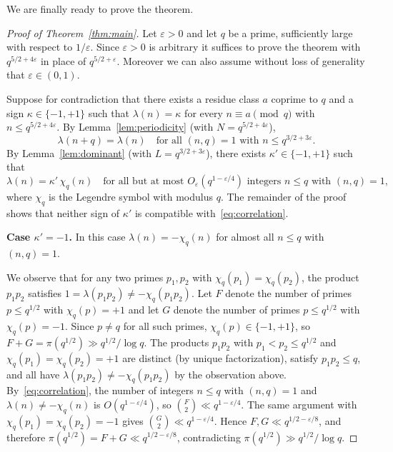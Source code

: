 \documentclass[11pt]{amsart}
\begin{document}
We are finally ready to prove the theorem. 

\begin{proof}[Proof of Theorem~\ref{thm:main}]
Let $\varepsilon > 0$ and let $q$ be a prime, sufficiently large
with respect to $1/\varepsilon$.
Since $\varepsilon > 0$ is arbitrary it suffices to prove the theorem
with $q^{5/2+4\varepsilon}$ in place of $q^{5/2+\varepsilon}$.
Moreover we can also assume without loss of generality that $\varepsilon \in (0,1)$. 

Suppose for contradiction that there exists a residue class $a$
coprime to $q$ and a sign $\kappa \in \{-1,+1\}$ such that
$\lambda(n) = \kappa$ for every $n \equiv a \pmod{q}$ with
$n \leq q^{5/2+4\varepsilon}$.
By Lemma~\ref{lem:periodicity} (with $N = q^{5/2+4\varepsilon}$),
\begin{equation}\label{eq:periodicity}
\lambda(n+q) = \lambda(n)
\quad \text{for all } (n,q) = 1 \text{ with }
n \leq q^{3/2+3\varepsilon}.
\end{equation}
By Lemma~\ref{lem:dominant} (with $L = q^{3/2+3\varepsilon}$),
there exists $\kappa' \in \{-1,+1\}$ such that
\begin{equation}\label{eq:correlation}
\lambda(n) = \kappa'\, \chi_q(n)
\quad \text{for all but at most } O_\varepsilon(q^{1-\varepsilon/4})
\text{ integers } n \leq q \text{ with } (n,q)=1,
\end{equation}
where $\chi_q$ is the Legendre symbol with modulus $q$.
The remainder of the proof shows that neither sign of $\kappa'$
is compatible with~\eqref{eq:correlation}.

\medskip
\noindent\textbf{Case $\kappa' = -1$.}
In this case $\lambda(n) = -\chi_q(n)$ for almost all
$n \leq q$ with $(n,q)=1$.
\medskip

We observe that for any two primes $p_1, p_2$ with
$\chi_q(p_1) = \chi_q(p_2)$, the product $p_1 p_2$
satisfies $1=\lambda(p_1 p_2) \neq -\chi_q(p_1 p_2)$.
Let $F$ denote the number of primes $p \leq q^{1/2}$
with $\chi_q(p) = +1$ and let $G$ denote the number
of primes $p \leq q^{1/2}$ with $\chi_q(p) = -1$.
Since $p \neq q$ for all such primes, $\chi_q(p) \in \{-1,+1\}$,
so $F + G = \pi(q^{1/2}) \gg q^{1/2}/\log q$.
The products $p_1 p_2$ with $p_1 < p_2 \leq q^{1/2}$
and $\chi_q(p_1) = \chi_q(p_2) = +1$ are distinct
(by unique factorization), satisfy $p_1 p_2 \leq q$,
and all have $\lambda(p_1 p_2) \neq -\chi_q(p_1 p_2)$
by the observation above.
By~\eqref{eq:correlation}, the number
of integers $n \leq q$ with $(n,q) = 1$ and
$\lambda(n) \neq -\chi_q(n)$ is $O(q^{1-\varepsilon/4})$,
so $\binom{F}{2} \ll q^{1-\varepsilon/4}$.
The same argument with $\chi_q(p_1) = \chi_q(p_2) = -1$
gives $\binom{G}{2} \ll q^{1-\varepsilon/4}$.
Hence $F, G \ll q^{1/2-\varepsilon/8}$, and therefore
$\pi(q^{1/2}) = F + G \ll q^{1/2-\varepsilon/8}$,
contradicting $\pi(q^{1/2}) \gg q^{1/2}/\log q$.


\end{proof}
\end{document}
